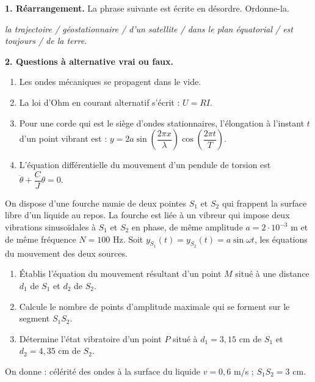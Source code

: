 \documentclass[11pt]{article}
\begin{document}


\noindent\textbf{1. Réarrangement.} La phrase suivante est écrite en désordre. Ordonne-la.

\textit{la trajectoire / géostationnaire / d'un satellite / dans le plan équatorial / est toujours / de la terre.}

\medskip
\noindent\textbf{2. Questions à alternative vrai ou faux.}
\begin{enumerate}[label=\alph*.]
  \item Les ondes mécaniques se propagent dans le vide.
  \item La loi d'Ohm en courant alternatif s'écrit : $U = RI$.
  \item Pour une corde qui est le siège d'ondes stationnaires, l'élongation à l'instant $t$ d'un point vibrant est : $y = 2a\sin\!\left(\dfrac{2\pi x}{\lambda}\right)\cos\!\left(\dfrac{2\pi t}{T}\right)$.
  \item L'équation différentielle du mouvement d'un pendule de torsion est $\ddot{\theta} + \dfrac{C}{J}\theta = 0$.
\end{enumerate}

On dispose d'une fourche munie de deux pointes $S_1$ et $S_2$ qui frappent la surface libre d'un liquide au repos. La fourche est liée à un vibreur qui impose deux vibrations sinusoïdales à $S_1$ et $S_2$ en phase, de même amplitude $a = 2\cdot10^{-3}$ m et de même fréquence $N = 100$ Hz. Soit $y_{S_1}(t) = y_{S_2}(t) = a\sin\omega t$, les équations du mouvement des deux sources.

\begin{enumerate}
  \item Établis l'équation du mouvement résultant d'un point $M$ situé à une distance $d_1$ de $S_1$ et $d_2$ de $S_2$.
  \item Calcule le nombre de points d'amplitude maximale qui se forment sur le segment $S_1 S_2$.
  \item Détermine l'état vibratoire d'un point $P$ situé à $d_1 = 3{,}15$ cm de $S_1$ et $d_2 = 4{,}35$ cm de $S_2$.
\end{enumerate}
\noindent On donne : célérité des ondes à la surface du liquide $v = 0{,}6$ m/s ; $S_1 S_2 = 3$ cm.

\end{document}
